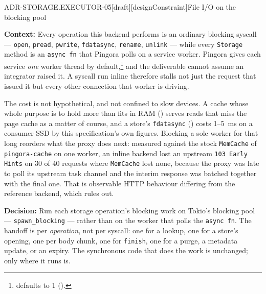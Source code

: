 \begin{requirement}{ADR-STORAGE.EXECUTOR-05}[draft][designConstraint]{File I/O on the blocking pool}


  \textbf{Context:} Every operation this backend performs is an ordinary
  blocking syscall --- \texttt{open}, \texttt{pread}, \texttt{pwrite},
  \texttt{fdatasync}, \texttt{rename}, \texttt{unlink} --- while every
  \texttt{Storage} method is an \texttt{async fn} that Pingora polls on a
  service worker. Pingora gives each service \emph{one} worker thread by
  default,\footnote{
  defaults to 1 ().}
  and the deliverable cannot assume an integrator raised it. A syscall run
  inline therefore stalls not just the request that issued it but every other
  connection that worker is driving.

  The cost is not hypothetical, and not confined to slow devices. A cache
  whose whole purpose is to hold more than fits in RAM
  () serves reads that miss the page cache
  as a matter of course, and a store's \texttt{fdatasync}
  () costs 1--5~ms on a consumer SSD by
  this specification's own figures. Blocking a sole worker for that long
  reorders what the proxy does next: measured against
  the stock \texttt{MemCache} of \texttt{pingora-cache} on one worker, an inline
  backend lost an upstream \texttt{103 Early Hints} on 30 of 40 requests where
  \texttt{MemCache} lost none, because the proxy was late to poll its upstream
  task channel and the interim response was batched together with the final
  one. That is observable HTTP behaviour differing from the reference backend,
  which  rules out.

  \textbf{Decision:} Run each storage operation's blocking work on Tokio's
  blocking pool --- \texttt{spawn\_blocking} --- rather than on the worker
  that polls the \texttt{async fn}. The handoff is per \emph{operation}, not
  per syscall: one for a lookup, one for a store's opening, one per body
  chunk, one for \texttt{finish}, one for a purge, a metadata update, or an
  expiry. The synchronous code that does the work is unchanged; only where it
  runs is.


\end{requirement}
